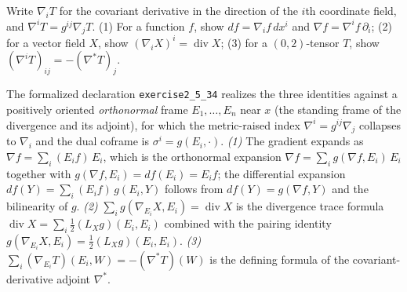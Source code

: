 \begin{remark}
  \label{rem:pet-ch2-ex-34}
  \leanok
  Write $\nabla_iT$ for the covariant derivative in the direction of the
  $i$th coordinate field, and $\nabla^iT=g^{ij}\nabla_jT$. (1) For a function
  $f$, show $df=\nabla_if\,dx^i$ and $\nabla f=\nabla^if\,\partial_i$; (2) for a
  vector field $X$, show $(\nabla_iX)^i=\operatorname{div}X$; (3) for a
  $(0,2)$-tensor $T$, show $(\nabla^iT)_{ij}=-(\nabla^*T)_j$.

  The formalized declaration \texttt{exercise2\_5\_34} realizes the three
  identities against a positively oriented \emph{orthonormal} frame
  $E_1,\dots,E_n$ near $x$ (the standing frame of the divergence and its
  adjoint), for which the metric-raised index $\nabla^i=g^{ij}\nabla_j$
  collapses to $\nabla_i$ and the dual coframe is $\sigma^i=g(E_i,\cdot)$.
  \emph{(1)} The gradient expands as $\nabla f=\sum_i(E_if)\,E_i$, which is the
  orthonormal expansion $\nabla f=\sum_i g(\nabla f,E_i)\,E_i$ together with
  $g(\nabla f,E_i)=df(E_i)=E_if$; the differential expansion
  $df(Y)=\sum_i(E_if)\,g(E_i,Y)$ follows from $df(Y)=g(\nabla f,Y)$ and the
  bilinearity of $g$. \emph{(2)} $\sum_i g(\nabla_{E_i}X,E_i)=\operatorname{div}X$
  is the divergence trace formula $\operatorname{div}X=\sum_i\tfrac12(L_Xg)(E_i,E_i)$
  combined with the pairing identity $g(\nabla_{E_i}X,E_i)=\tfrac12(L_Xg)(E_i,E_i)$.
  \emph{(3)} $\sum_i(\nabla_{E_i}T)(E_i,W)=-(\nabla^*T)(W)$ is the defining
  formula of the covariant-derivative adjoint $\nabla^*$.
\end{remark}
